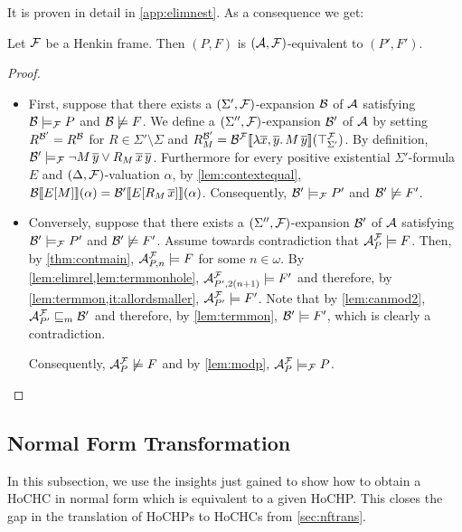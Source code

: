 \documentclass[a4paper,twoside,notitlepage,openright,11pt]{report}
\begin{document}
It is proven in detail in \cref{app:elimnest}. As a consequence we get:
\begin{proposition}
  \label{prop:elimnested}
  Let $\mathcal F$ be a Henkin frame.
  Then $(P,F)$ is $(\mathcal A,\mathcal F)$-equivalent to $(P',F')$.
\end{proposition}
\begin{proof}
  \begin{itemize}
  \item First, suppose that there exists a $(\Sigma',\mathcal F)$-expansion $\mathcal B$ of $\mathcal A$ satisfying $\mathcal B\models_\mathcal F P$ and $\mathcal B\not\models F$. We define a $(\Sigma'',\mathcal F)$-expansion $\mathcal B'$ of $\mathcal A$ by setting $R^{\mathcal B'}=R^\mathcal B$ for $R\in\Sigma'\setminus\Sigma$ and $R_M^{\mathcal B'}={\mathcal B}^\mathcal F\llbracket\lambda\overline x,\overline y\ldotp M\,\overline y\rrbracket(\top_{\Sigma'}^\mathcal F)$. By definition, $\mathcal B'\models_\mathcal F\neg M\,\overline y\lor R_M\,\overline x\,\overline y$. Furthermore for every positive existential $\Sigma'$-formula $E$ and $(\Delta,\mathcal F)$-valuation $\alpha$, by \cref{lem:contextequal}, ${\mathcal B}\llbracket E[M]\rrbracket(\alpha)={\mathcal B'}\llbracket E[R_M\,\overline x]\rrbracket(\alpha)$.
    Consequently, $\mathcal B'\models_\mathcal F P'$ and $\mathcal B'\not\models F'$.
  \item Conversely, suppose that there exists a $(\Sigma'',\mathcal F)$-expansion $\mathcal B'$ of $\mathcal A$ satisfying $\mathcal B'\models_\mathcal F P'$ and $\mathcal B'\not\models F'$. %
    Assume towards contradiction that $\mathcal A_P^\mathcal F\models F$. Then, by \cref{thm:contmain}, $\mathcal A^\mathcal F_{P,n}\models F$  for some $n\in\omega$.
    By \cref{lem:elimrel,lem:termmonhole}, $\mathcal A^\mathcal F_{P',2(n+1)}\models F'$ and therefore, by \cref{lem:termmon,it:allordsmaller}, $\mathcal A^\mathcal F_{P'}\models F'$. Note that by \cref{lem:canmod2}, $\mathcal A^\mathcal F_{P'}\sqsubseteq_m\mathcal B'$ and therefore, by \cref{lem:termmon}, $\mathcal B'\models F'$, which is clearly a contradiction.

    Consequently, $\mathcal A^\mathcal F_P\not\models F$ and by \cref{lem:modp}, $\mathcal A^\mathcal F_P\models_\mathcal F P$.\qedhere
  \end{itemize}
\end{proof}

\subsection{Normal Form Transformation}
\label{sec:normalform}
In this subsection, we use the insights just gained to show how to obtain a HoCHC in normal form which is equivalent to a given HoCHP. This closes the gap in the translation of HoCHPs to HoCHCs from \cref{sec:nftrans}.
\end{document}
